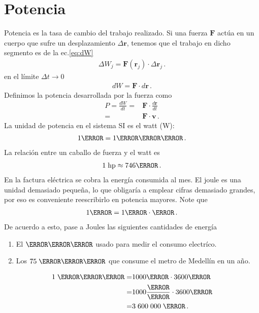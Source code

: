   
\section{Potencia}
Potencia es la tasa de cambio del trabajo realizado. Si una fuerza $\mathbf{F}$ actúa en un cuerpo que sufre un desplazamiento $\Delta\mathbf{r}$, tenemos que el trabajo en dicho segmento es de la ec.\eqref{eq:dW}
\begin{align}
  \Delta W_j=\mathbf{F}(\mathbf{r}_j)\cdot \Delta \mathbf{r}_j\,.
\end{align}
en el límite $\Delta t\to 0$
\begin{align}
  dW=\mathbf{F}\cdot d\mathbf{r}\,.
\end{align}
Definimos la potencia desarrollada por la fuerza como
\begin{align}
  P=\frac{dW}{dt}=&\mathbf{F}\cdot \frac{d\mathbf{r}}{dt}\nonumber\\
=&\mathbf{F}\cdot \mathbf{v}\,.
\end{align}
La unidad de potencia en el sistema SI es el watt (W):
\begin{align}
  \unit{1}{\watt}=\unit{1}{\joule\per\second}\,.
\end{align}
La relación entre un caballo de fuerza y el watt es
\begin{align}
  1\;\text{hp}\approx \unit{746}{\watt}\,.
\end{align}
\example{} 
En la factura eléctrica se cobra la energía consumida al
mes.  El joule es una unidad demasiado pequeña, lo que obligaría a
emplear cifras demasiado grandes, por eso es conveniente reescribirlo
en potencia mayores. Note que
\begin{align}
  1\joule=1\watt\cdot\second\,.
\end{align}
De acuerdo a esto, pase a Joules las siguientes cantidades de energía
\begin{enumerate}
\item El $\kilo\watt\hour$ usado para medir el consumo electríco.
\item Los $75\;\giga\watt\hour$ que consume el metro de Medellín en un año. 
\end{enumerate}
\begin{align*}
  1\;\kilo\watt\hour=&1000\watt\cdot 3600\second\nonumber\\
  =&1000\frac{\joule}{\second}\cdot 3600\second\nonumber\\
  =&3\;600\;000\; \joule\,.
\end{align*}

